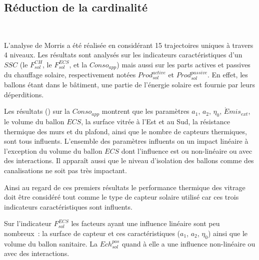 \subsection{Réduction de la cardinalité} %
\label{sub:reduction_de_la_cardinalite}
~

L’analyse de Morris a été réalisée en considérant \num{15} trajectoires uniques à travers
\num{4} niveaux. Les résultats sont analysés sur les indicateurs caractéristiques d’un $SSC$
(le $F_{sol}^{CH}$, le $F_{sol}^{ECS}$, et la $Conso_{app}$) mais aussi sur les parts
actives et passives du chauffage solaire, respectivement notées $Prod_{sol}^{active}$ et
$Prod_{sol}^{passive}$. En effet, les ballons étant dans le bâtiment, une partie de
l’énergie solaire est fournie par leurs déperditions.

Les résultats () sur la $Conso_{app}$ montrent
que les paramètres $a_{1}$, $a_{2}$, $\eta_{0}$, $\acute Emis_{ext}$, le volume du ballon $ECS$,
la surface vitrée à l’Est et au Sud, la résistance thermique des murs et du plafond, ainsi que le nombre de capteurs thermiques,
sont tous influents. L’ensemble des paramètres influents on un impact linéaire à l’exception
du volume du ballon $ECS$ dont l’influence est ou non-linéaire ou avec des interactions.
Il apparaît aussi que le niveau d’isolation des ballons comme des canalisations ne soit pas
très impactant.

Ainsi au regard de ces premiers résultats le performance thermique des vitrage doit être
considéré tout comme le type de capteur solaire utilisé car ces trois indicateurs caractéristiques
sont influents.

Sur l’indicateur $F_{sol}^{ECS}$ les facteurs ayant une influence linéaire sont
peu nombreux~: la surface de capteur et ces caractéristiques ($a_{1}$, $a_{2}$, $\eta_{0}$)
ainsi que le volume du ballon sanitaire. La $Ech_{sol}^{pos}$ quand à elle a une influence
non-linéaire ou avec des interactions.


